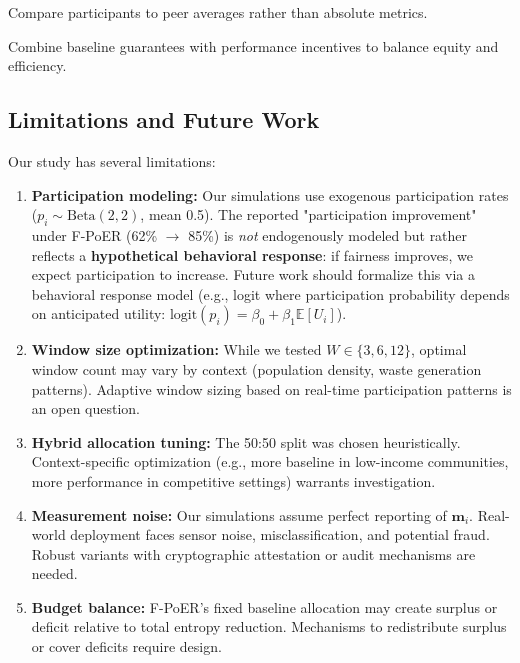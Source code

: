 \documentclass[12pt,a4paper]{article}
\begin{document}
\begin{principle}
Compare participants to peer averages rather than absolute metrics.
\end{principle}

\begin{principle}
Combine baseline guarantees with performance incentives to balance equity and efficiency.
\end{principle}

\subsection{Limitations and Future Work}

Our study has several limitations:

\begin{enumerate}
    \item \textbf{Participation modeling:} Our simulations use exogenous participation rates ($p_i \sim \text{Beta}(2,2)$, mean 0.5). The reported "participation improvement" under F-PoER (62\% $\rightarrow$ 85\%) is \textit{not} endogenously modeled but rather reflects a \textbf{hypothetical behavioral response}: if fairness improves, we expect participation to increase. Future work should formalize this via a behavioral response model (e.g., logit where participation probability depends on anticipated utility: $\text{logit}(p_i) = \beta_0 + \beta_1 \mathbb{E}[U_i]$).
    
    \item \textbf{Window size optimization:} While we tested $W \in \{3, 6, 12\}$, optimal window count may vary by context (population density, waste generation patterns). Adaptive window sizing based on real-time participation patterns is an open question.
    
    \item \textbf{Hybrid allocation tuning:} The 50:50 split was chosen heuristically. Context-specific optimization (e.g., more baseline in low-income communities, more performance in competitive settings) warrants investigation.
    
    \item \textbf{Measurement noise:} Our simulations assume perfect reporting of $\mathbf{m}_i$. Real-world deployment faces sensor noise, misclassification, and potential fraud. Robust variants with cryptographic attestation or audit mechanisms are needed.
    
    \item \textbf{Budget balance:} F-PoER's fixed baseline allocation may create surplus or deficit relative to total entropy reduction. Mechanisms to redistribute surplus or cover deficits require design.
\end{enumerate}
\end{document}
